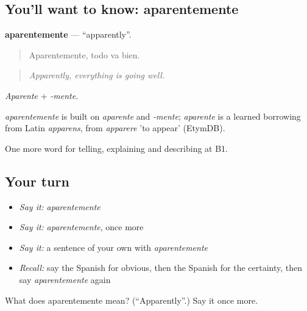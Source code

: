 \subsection*{You'll want to know: aparentemente}
\textbf{aparentemente} — \textquotedblleft{}apparently\textquotedblright{}.

\begin{quote}
Aparentemente, todo va bien.
\end{quote}

\begin{quote}
\emph{Apparently, everything is going well.}
\end{quote}

\emph{Aparente} + \emph{-mente}.

\begin{cousinweb}
\emph{aparentemente} is built on \emph{aparente} and \emph{-mente}; \emph{aparente} is a learned borrowing from Latin \emph{apparens}, from \emph{apparere} 'to appear' (EtymDB).
\end{cousinweb}

\begin{grammarlens}[title={What you've built}]
One more word for telling, explaining and describing at B1.
\end{grammarlens}

\subsection*{Your turn}
\begin{itemize}
\raggedright
  \item \emph{Say it:} \emph{aparentemente}
  \item \emph{Say it:} \emph{aparentemente}, once more
  \item \emph{Say it:} a sentence of your own with \emph{aparentemente}
  \item \emph{Recall:} say the Spanish for obvious, then the Spanish for the certainty, then say \emph{aparentemente} again
\end{itemize}

\begin{tcolorbox}[breakable,colback=teal!4,colframe=teal!35!black,title={Before you move on}]
What does aparentemente mean? (\textquotedblleft{}Apparently\textquotedblright{}.) Say it once more.
\end{tcolorbox}
